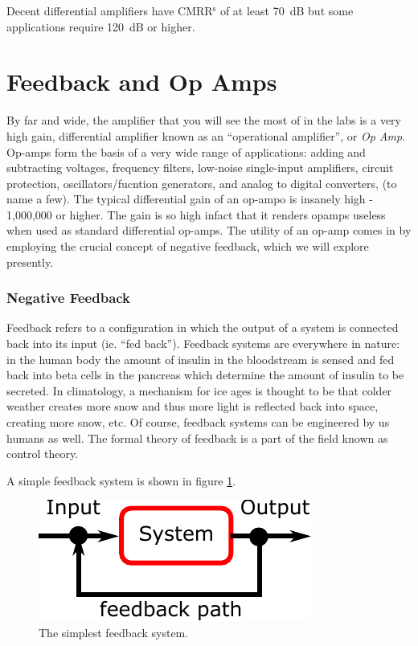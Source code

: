 \documentclass[]{article}
\begin{document}
Decent differential amplifiers have CMRR$^\text{s}$ of at least 70~dB but some applications require 120~dB or higher.

\section{Feedback and Op Amps}
By far and wide, the amplifier that you will see the most of in the labs is a very high gain, differential amplifier known as an ``operational amplifier'', or \textit{Op Amp}. Op-amps form the basis of a very wide range of applications: adding and subtracting voltages, frequency filters, low-noise single-input amplifiers, circuit protection, oscillators/fucntion generators, and analog to digital converters, (to name a few). The typical differential gain of an op-ampo is insanely high - 1,000,000 or higher. The gain is so high infact that it renders opamps useless when used as standard differential op-amps. The utility of an op-amp comes in by employing the crucial concept of negative feedback, which we will explore presently.

\subsubsection{Negative Feedback}
Feedback refers to a configuration in which the output of a system is connected back into its input (ie. ``fed back''). Feedback systems are everywhere in nature: in the human body the amount of insulin in the bloodstream is sensed and fed back into beta cells in the pancreas which determine the amount of insulin to be secreted. In climatology, a mechanism for ice ages is thought to be that colder weather creates more snow and thus more light is reflected back into space, creating more snow, etc. Of course, feedback systems can be engineered by us humans as well. The formal theory of feedback is a part of the field known as control theory.

A simple feedback system is shown in figure \ref{fig:simple_feedback}.

\begin{figure}[ht]
\caption{The simplest feedback system.}
\label{fig:simple_feedback}
\begin{center}
\includegraphics[]{Images/simple_feedback.pdf}
\end{center}
\end{figure}
\end{document}
